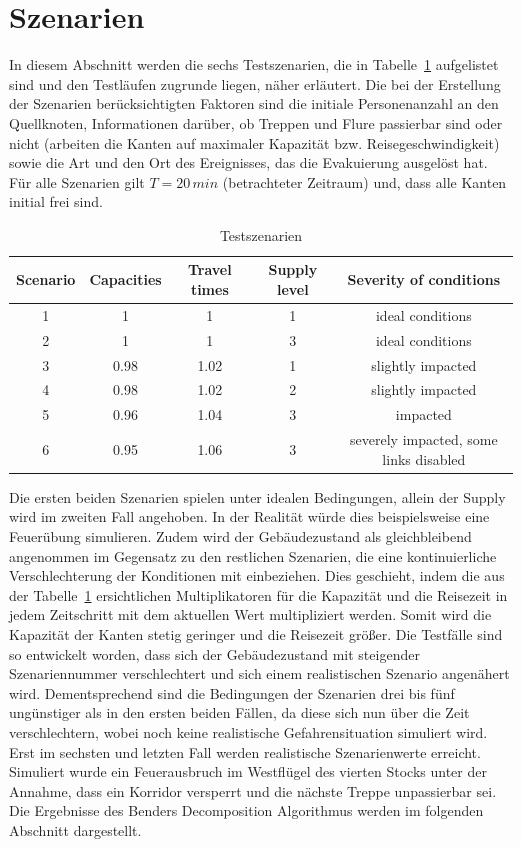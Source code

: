 \documentclass[a4paper, 11pt]{scrreprt}
\begin{document}
\section{Szenarien}
In diesem Abschnitt werden die sechs Testszenarien, die in Tabelle~\ref{tab:scenarios} aufgelistet sind und den
Testläufen zugrunde liegen, näher erläutert.
Die bei der Erstellung der Szenarien berücksichtigten Faktoren sind die initiale Personenanzahl an
den Quellknoten, Informationen darüber, ob Treppen und Flure passierbar sind oder nicht (arbeiten die Kanten
auf maximaler Kapazität bzw. Reisegeschwindigkeit) sowie die Art und den Ort des Ereignisses, das die
Evakuierung ausgelöst hat.
Für alle Szenarien gilt $T = 20\,min$ (betrachteter Zeitraum) und, dass alle Kanten initial frei sind.
\begin{table}[htb!]
\centering
\caption{Testszenarien}
\label{tab:scenarios}
\begin{tabular}[c]{|c|c|c|c|c|}\hline
  Scenario & Capacities & Travel times & Supply level & Severity of conditions\\\hline\hline
  1 & 1    & 1    & 1 & ideal conditions \\\hline
  2 & 1    & 1    & 3 & ideal conditions \\\hline
  3 & 0.98 & 1.02 & 1 & slightly impacted \\\hline
  4 & 0.98 & 1.02 & 2 & slightly impacted \\\hline
  5 & 0.96 & 1.04 & 3 & impacted \\\hline
  6 & 0.95 & 1.06 & 3 & severely impacted, some links disabled \\\hline
\end{tabular}
\end{table}
Die ersten beiden Szenarien spielen unter idealen Bedingungen, allein der Supply wird im zweiten
Fall angehoben. In der Realität würde dies beispielsweise eine Feuerübung simulieren.
Zudem wird der Gebäudezustand als gleichbleibend angenommen im Gegensatz zu den restlichen
Szenarien, die eine kontinuierliche Verschlechterung der Konditionen mit einbeziehen.
Dies geschieht, indem die aus der Tabelle~\ref{tab:scenarios} ersichtlichen Multiplikatoren für die Kapazität und
die Reisezeit in jedem Zeitschritt mit dem aktuellen Wert multipliziert werden.
Somit wird die Kapazität der Kanten stetig geringer und die Reisezeit größer.
Die Testfälle sind so entwickelt worden, dass sich der Gebäudezustand mit steigender Szenariennummer
verschlechtert und sich einem realistischen Szenario angenähert wird.
Dementsprechend sind die Bedingungen der Szenarien drei bis fünf ungünstiger als in den ersten beiden Fällen,
da diese sich nun über die Zeit verschlechtern, wobei noch keine realistische Gefahrensituation simuliert wird.
Erst im sechsten und letzten Fall werden realistische Szenarienwerte erreicht. Simuliert wurde ein
Feuerausbruch im Westflügel des vierten Stocks unter der Annahme, dass ein Korridor versperrt und die
nächste Treppe unpassierbar sei.\\
Die Ergebnisse des Benders Decomposition Algorithmus werden im folgenden Abschnitt dargestellt.
\end{document}
